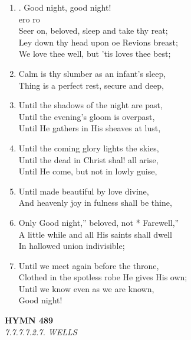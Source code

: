 \documentclass[11pt,a4paper]{article}
\begin{document}
\begin{enumerate}
    \item . Good night, good night! \\
        ero ro \\
        Seer on, beloved, sleep and take thy reat; \\
        Ley down thy head upon oe Revions breast; \\
        We love thee well, but 'tis loves thee best;

    \item Calm is thy slumber as an infant's sleep, \\
        Thing is a perfect rest, secure and deep,

    \item Until the shadows of the night are past, \\
        Until the evening's gloom is overpast, \\
        Until He gathers in His sheaves at lust,

    \item Until the coming glory lights the skies, \\
        Until the dead in Christ shal! all arise, \\
        Until He come, but not in lowly guise,

    \item Until made beautiful by love divine, \\
        And heavenly joy in fulness shall be thine,

    \item Only Good night,'' beloved, not * Farewell,'' \\
        A little while and all His saints shall dwell \\
        In hallowed union indivisible;

    \item Until we meet again before the throne, \\
        Clothed in the spotless robe He gives His own; \\
        Until we know even as we are known, \\
        Good night!

\end{enumerate}

\newpage
\begin{center}
    {\Large \textbf{HYMN 489}}
    \\
    \textit{7.7.7.7.2.7. WELLS}
\end{center}
\vspace{1em}
\end{document}
